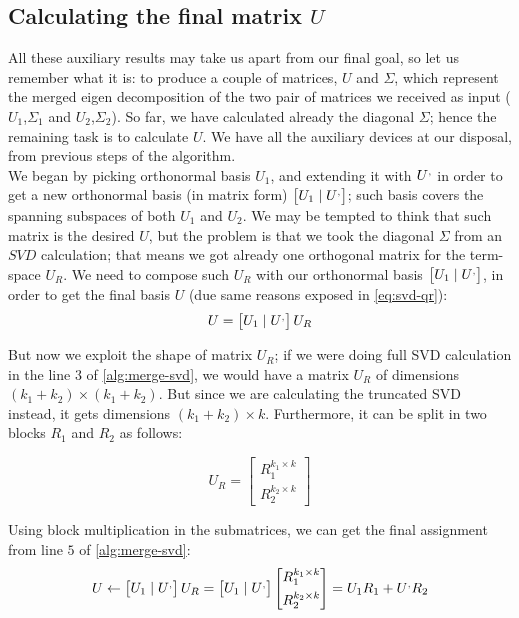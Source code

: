 \subsection{Calculating the final matrix $U$}

All these auxiliary results may take us apart from our final goal, so
let us remember what it is: to produce a couple of matrices, $U$ and
$\Sigma$, which represent the merged eigen decomposition of the two
pair of matrices we received as input ($U_1$,$\Sigma_1$ and
$U_2$,$\Sigma_2$). So far, we have calculated already the diagonal
$\Sigma$; hence the remaining task is to calculate $U$. We have all
the auxiliary devices at our disposal, from previous steps of the
algorithm. \\

We began by picking orthonormal basis $U_1$, and extending it with
$\prim{U}$ in order to get a new orthonormal basis (in matrix form)
$\begin{bmatrix}U_1 \mid \prim{U}\end{bmatrix}$; such basis covers the
spanning subspaces of both $U_1$ and $U_2$. We may be tempted to
think that such matrix is the desired $U$, but the problem is that we
took the diagonal $\Sigma$ from an $SVD$ calculation; that means we
got already one orthogonal matrix for the term-space $U_R$. We need to
compose such $U_R$ with our orthonormal basis 
$\begin{bmatrix}U_1 \mid  \prim{U}\end{bmatrix}$, in order to get the final basis $U$
(due same reasons exposed in \cref{eq:svd-qr}): \\

\[
U = \begin{bmatrix}U_1 \mid  \prim{U}\end{bmatrix} U_R
\]
\hfill

But now we exploit the shape of matrix $U_R$; if we were doing full SVD
calculation in the line $3$ of \cref{alg:merge-svd}, we would have a
matrix $U_R$ of dimensions $(k_1+k_2) \times (k_1+k_2)$. But since we
are calculating the truncated SVD instead, it gets dimensions
$(k_1+k_2) \times k$. Furthermore, it can be split in two blocks $R_1$
and $R_2$ as follows: 

\[
U_R = 
\begin{bmatrix}
R_1^{k_1 \times k} \\[0.4em]
R_2^{k_2 \times k}
\end{bmatrix}
\]
\hfill

Using block multiplication in the submatrices, we can get the final
assignment from line $5$ of \cref{alg:merge-svd}: \\

\[
U \leftarrow 
\begin{bmatrix}U_1 \mid  \prim{U}\end{bmatrix} U_R =
\begin{bmatrix}U_1 \mid  \prim{U}\end{bmatrix} 
\begin{bmatrix}
R_1^{k_1 \times k} \\[0.4em]
R_2^{k_2 \times k}
\end{bmatrix} =
U_1R_1 + \prim{U}R_2
\]
\hfill
